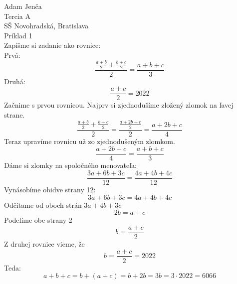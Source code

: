 \documentclass{article}
\begin{document}
\noindent
Adam Jenča\\
Tercia A\\
SŠ Novohradská, Bratislava\\
Príklad 1\\
\vskip 10mm \noindent
Zapíšme si zadanie ako rovnice:\\
Prvá:
$$
\frac{\frac{a + b}{2} + \frac{b + c}{2}}{2} = \frac{a+b+c}{3}
$$
Druhá:
$$
\frac{a + c}{2} = 2022
$$
Začnime s prvou rovnicou.
Najprv si zjednodušíme zložený zlomok na ľavej strane.
$$
\frac{\frac{a + b}{2} + \frac{b + c}{2}}{2} = \frac{\frac{a+2b+c}{2}}{2} = \frac{a+2b+c}{4}
$$
Teraz upravíme rovnicu už zo zjednodušeným zlomkom.
$$
\frac{a+2b+c}{4} =  \frac{a+b+c}{3}
$$
Dáme si zlomky na spoločného menovateľa:
$$
\frac{3a+6b+3c}{12} = \frac{4a+4b+4c}{12}
$$
Vynásobíme obidve strany 12:
$$
3a+6b+3c = 4a+4b+4c
$$
Odčítame od oboch strán $3a+4b+3c$
$$
2b = a+c
$$
Podelíme obe strany 2
$$
b = \frac{a+c}{2}
$$
Z druhej rovnice vieme, že 
$$
b = \frac{a+c}{2} = 2022
$$
Teda:
$$
a+b+c = b + (a+c) = b + 2b = 3b = 3 \cdot 2022 = 6066
$$
\end{document}
